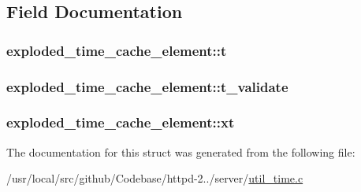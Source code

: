 \subsection{Field Documentation}
\subsubsection[{\texorpdfstring{t}{t}}]{ exploded\+\_\+time\+\_\+cache\+\_\+element\+::t}\hypertarget{structexploded__time__cache__element_a56a3dc7ba61fbc5dc9470147f626afd1}{}\label{structexploded__time__cache__element_a56a3dc7ba61fbc5dc9470147f626afd1}
\subsubsection[{\texorpdfstring{t\+\_\+validate}{t_validate}}]{ exploded\+\_\+time\+\_\+cache\+\_\+element\+::t\+\_\+validate}\hypertarget{structexploded__time__cache__element_a7c31f8dc437a867e496992097411050d}{}\label{structexploded__time__cache__element_a7c31f8dc437a867e496992097411050d}
\subsubsection[{\texorpdfstring{xt}{xt}}]{ exploded\+\_\+time\+\_\+cache\+\_\+element\+::xt}\hypertarget{structexploded__time__cache__element_a11c2e64468a4c7ea28a61894b796fa14}{}\label{structexploded__time__cache__element_a11c2e64468a4c7ea28a61894b796fa14}


The documentation for this struct was generated from the following file\+:\begin{DoxyCompactItemize}
\item 
/usr/local/src/github/\+Codebase/httpd-\/2../server/\hyperlink{util__time_8c}{util\+\_\+time.\+c}\end{DoxyCompactItemize}
